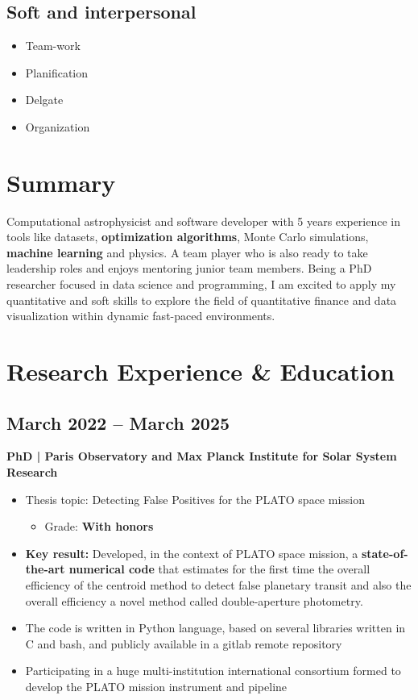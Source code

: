 \documentclass[11pt,a4paper]{article}
\begin{document}
\begin{multicols}{2}
		\subsection{Soft and interpersonal}
		
		\begin{itemize}
			\item Team-work
			\item Planification
			\item Delgate
			\item Organization
		\end{itemize}
		
		\section{Summary}
		Computational astrophysicist and software developer with 5 years experience in tools like datasets, \textbf{optimization algorithms}, Monte Carlo simulations, \textbf{machine learning} and physics. A team player who is also ready to take leadership roles and enjoys mentoring junior team members. Being a PhD researcher focused in data science and programming, I am excited to apply my quantitative and soft skills to explore the field of quantitative finance and data visualization within dynamic fast-paced environments.
		
		\section{Research Experience \& Education}
		
		
		\subsection{March 2022 – March 2025}
		\textbf{PhD | Paris Observatory and Max Planck Institute for Solar System Research}
		\begin{itemize}
			\item Thesis topic: Detecting False Positives for the PLATO space mission
			\begin{itemize}
				\item Grade: \textbf{With honors}
			\end{itemize}
			\item \textbf{Key result:} Developed, in the context of PLATO space mission, a \textbf{state-of-the-art numerical code} that estimates for the first time the overall efficiency of the centroid method to detect false planetary transit and also the overall efficiency a novel method called double-aperture photometry.
			\item The code is written in Python language, based on several libraries written in C and bash, and publicly available in a gitlab remote repository
			\item Participating in a huge multi-institution international consortium formed to develop the PLATO mission instrument and pipeline
		\end{itemize}
		

\end{multicols}
\end{document}
